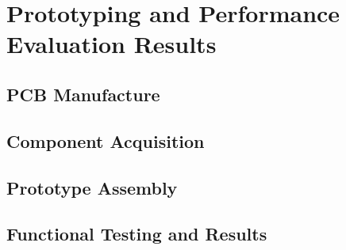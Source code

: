 

\chapter{Prototyping and Performance Evaluation Results}\label{cha:chapter4_PrototypingPerf}

\section{PCB Manufacture}\label{sec:41_PCBmanufacture}

\section{Component Acquisition}\label{sec:42_ComponentAcquisition}

\section{Prototype Assembly}\label{sec:43_PrototypeAssembly}

\section{Functional Testing and Results}\label{sec:44_FunctionalTesting}
